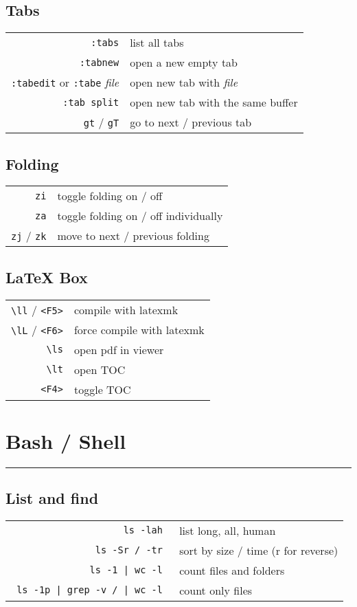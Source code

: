\begin{multicols*}{3}
\subsection*{Tabs}
\begin{tabular}{@{}rl@{}}
  \verb|:tabs| & list all tabs \\
  \verb|:tabnew| & open a new empty tab \\
  \verb|:tabedit| or \verb|:tabe| \itshape{file} & open new tab with \itshape{file} \\
  \verb|:tab split| & open new tab with the same buffer \\
  \verb|gt| / \verb|gT| & go to next / previous tab
\end{tabular}

\subsection*{Folding}
\begin{tabular}{@{}rl@{}}
  \verb|zi| & toggle folding on / off \\
  \verb|za| & toggle folding on / off individually \\
  \verb|zj| / \verb|zk| & move to next / previous folding
\end{tabular}

\subsection*{LaTeX Box}
\begin{tabular}{@{}rl@{}}
    \verb|\ll| / \verb|<F5>| & compile with latexmk \\
    \verb|\lL| / \verb|<F6>| & force compile with latexmk \\
    \verb|\ls| & open pdf in viewer \\
    \verb|\lt| & open TOC \\
    \verb|<F4>| & toggle TOC 
\end{tabular}

\section*{Bash / Shell}
\hrule\vspace*{2pt}
\subsection*{List and find}
\begin{tabular}{@{}rl@{}}
\verb| ls -lah | & list long, all, human \\
\verb| ls -Sr / -tr | & sort by size / time (r for reverse) \\
\verb= ls -1 | wc -l = & count files and folders \\
\verb= ls -1p | grep -v / | wc -l = & count only files
\end{tabular}

\end{multicols*}
